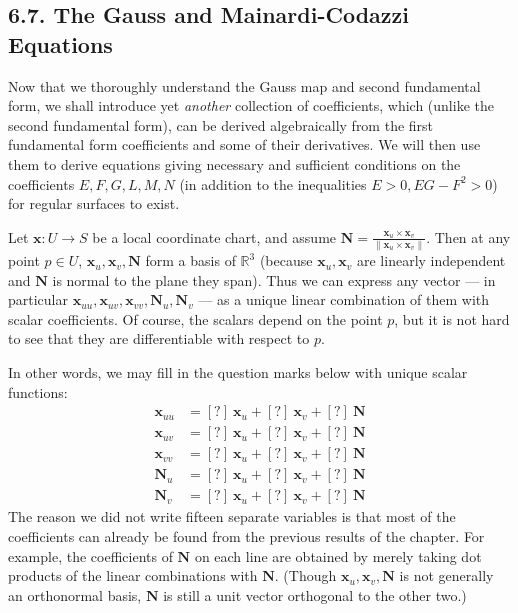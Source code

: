 \documentclass[leqno]{book}
\begin{document}
\subsection*{6.7. The Gauss and Mainardi-Codazzi Equations}
Now that we thoroughly understand the Gauss map and second fundamental form, we shall introduce yet \emph{another} collection of coefficients, which (unlike the second fundamental form), can be derived algebraically from the first fundamental form coefficients and some of their derivatives.  We will then use them to derive equations giving necessary and sufficient conditions on the coefficients $E,F,G,L,M,N$ (in addition to the inequalities $E>0,EG-F^2>0$) for regular surfaces to exist.

Let $\mathbf x:U\to S$ be a local coordinate chart, and assume $\mathbf N=\frac{\mathbf x_u\times\mathbf x_v}{\|\mathbf x_u\times\mathbf x_v\|}$.  Then at any point $p\in U$, $\mathbf x_u,\mathbf x_v,\mathbf N$ form a basis of $\mathbb R^3$ (because $\mathbf x_u,\mathbf x_v$ are linearly independent and $\mathbf N$ is normal to the plane they span).  Thus we can express any vector \---- in particular $\mathbf x_{uu},\mathbf x_{uv},\mathbf x_{vv},\mathbf N_u,\mathbf N_v$ \---- as a unique linear combination of them with scalar coefficients.  Of course, the scalars depend on the point $p$, but it is not hard to see that they are differentiable with respect to $p$.

In other words, we may fill in the question marks below with unique scalar functions:
\begin{align*}
\mathbf x_{uu}&=[?]~\mathbf x_u+[?]~\mathbf x_v+[?]~\mathbf N\\
\mathbf x_{uv}&=[?]~\mathbf x_u+[?]~\mathbf x_v+[?]~\mathbf N\\
\mathbf x_{vv}&=[?]~\mathbf x_u+[?]~\mathbf x_v+[?]~\mathbf N\\
\mathbf N_u&=[?]~\mathbf x_u+[?]~\mathbf x_v+[?]~\mathbf N\\
\mathbf N_v&=[?]~\mathbf x_u+[?]~\mathbf x_v+[?]~\mathbf N
\end{align*}
The reason we did not write fifteen separate variables is that most of the coefficients can already be found from the previous results of the chapter.  For example, the coefficients of $\mathbf N$ on each line are obtained by merely taking dot products of the linear combinations with $\mathbf N$.  (Though $\mathbf x_u,\mathbf x_v,\mathbf N$ is not generally an orthonormal basis, $\mathbf N$ is still a unit vector orthogonal to the other two.)
\end{document}
